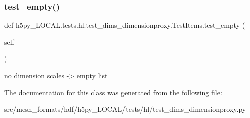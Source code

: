 \subsubsection{\texorpdfstring{test\+\_\+empty()}{test\_empty()}}
{\footnotesize\ttfamily def h5py\+\_\+\+L\+O\+C\+A\+L.\+tests.\+hl.\+test\+\_\+dims\+\_\+dimensionproxy.\+Test\+Items.\+test\+\_\+empty (\begin{DoxyParamCaption}\item[{}]{self }\end{DoxyParamCaption})}

\begin{DoxyVerb}no dimension scales -> empty list \end{DoxyVerb}
 

The documentation for this class was generated from the following file\+:\begin{DoxyCompactItemize}
\item 
src/mesh\+\_\+formats/hdf/h5py\+\_\+\+L\+O\+C\+A\+L/tests/hl/test\+\_\+dims\+\_\+dimensionproxy.\+py\end{DoxyCompactItemize}
